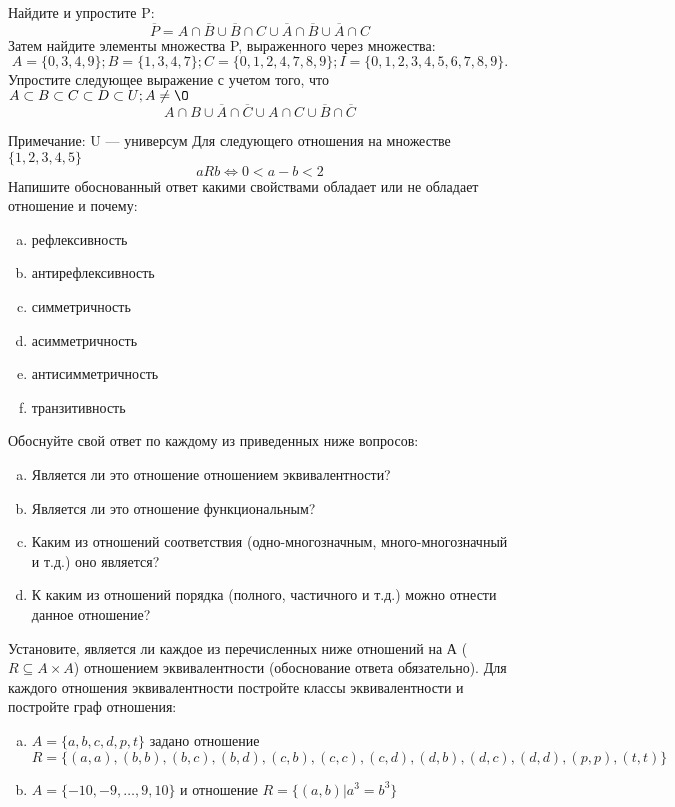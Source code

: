 \documentclass[10pt]{exam}
\begin{document}
\begin{questions}
\question
Найдите и упростите P:
\begin{equation*}
\overline{P} = A \cap \overline{B} \cup \overline{B} \cap C \cup \overline{A} \cap \overline{B} \cup \overline{A} \cap C
\end{equation*}
Затем найдите элементы множества P, выраженного через множества:
\begin{equation*}
A = \{0, 3, 4, 9\}; 
B = \{1, 3, 4, 7\};
C = \{0, 1, 2, 4, 7, 8, 9\};
I = \{0, 1, 2, 3, 4, 5, 6, 7, 8, 9\}.
\end{equation*}\question
Упростите следующее выражение с учетом того, что $A\subset B \subset C \subset D \subset U; A \neq \O$
\begin{equation*}
A \cap B \cup \overline{A} \cap \overline{C} \cup A \cap C \cup \overline{B} \cap \overline{C}
\end{equation*}

Примечание: U — универсум\question
Для следующего отношения на множестве $\{1, 2, 3, 4, 5\}$ 
\begin{equation*}
aRb \iff 0 < a-b<2
\end{equation*}
Напишите обоснованный ответ какими свойствами обладает или не обладает отношение и почему:   
\begin{enumerate} [a)]\setcounter{enumi}{0}
\item рефлексивность
\item антирефлексивность
\item симметричность
\item асимметричность
\item антисимметричность
\item транзитивность
\end{enumerate}

Обоснуйте свой ответ по каждому из приведенных ниже вопросов:
\begin{enumerate} [a)]\setcounter{enumi}{0}
    \item Является ли это отношение отношением эквивалентности?
    \item Является ли это отношение функциональным?
    \item Каким из отношений соответствия (одно-многозначным, много-многозначный и т.д.) оно является?
    \item К каким из отношений порядка (полного, частичного и т.д.) можно отнести данное отношение?
\end{enumerate}
\question
Установите, является ли каждое из перечисленных ниже отношений на А ($R \subseteq A \times A$) отношением эквивалентности (обоснование ответа обязательно). Для каждого отношения эквивалентности постройте классы 
эквивалентности и постройте граф отношения:
\begin{enumerate} [a)]\setcounter{enumi}{0}
\item $A = \{a, b, c, d, p, t\}$ задано отношение $R = \{(a, a), (b, b), (b, c), (b, d), (c, b), (c, c), (c, d), (d, b), (d, c), (d, d), (p,p), (t,t)\}$
\item $A = \{-10, -9, … , 9, 10\}$ и отношение $R = \{(a,b)|a^{3} = b^{3}\}$


\end{enumerate}
\end{questions}
\end{document}
